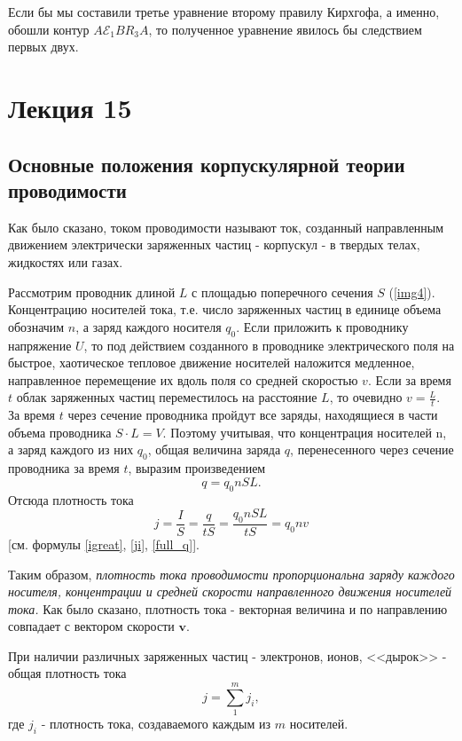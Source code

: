 \documentclass[a4paper,10pt]{book}
\begin{document}
Если бы мы составили третье уравнение  второму правилу Кирхгофа, а именно, обошли контур $A\mathcal{E}_1BR_3A$, то полученное уравнение
явилось бы следствием первых двух.
\chapter{Лекция 15}
\section*{Основные положения корпускулярной теории проводимости}
Как было сказано, током проводимости называют ток, созданный направленным движением электрически заряженных частиц - корпускул - в твердых телах,
 жидкостях или газах.
 
Рассмотрим проводник длиной $L$ с площадью поперечного сечения $S$ (\ref{img4}). Концентрацию носителей тока, т.е. число заряженных частиц 
в единице объема обозначим $n$, а заряд каждого носителя $q_0$. Если приложить к проводнику напряжение $U$, то под действием созданного в 
проводнике электрического поля на быстрое, хаотическое тепловое движение носителей наложится медленное, направленное перемещение их вдоль
поля со средней скоростью $v$. Если за время $t$ облак заряженных частиц переместилось на расстояние $L$, то очевидно $v = \frac{L}{t}$. 
За время $t$ через сечение проводника пройдут все заряды, находящиеся в части объема проводника $S\cdot L = V$. Поэтому учитывая, что концентрация
носителей n, а заряд каждого из них $q_0$, общая величина заряда $q$, перенесенного через сечение проводника за время $t$, выразим произведением
\begin{equation}\label{full_q}
 q = q_0nSL.
\end{equation}
Отсюда плотность тока
\begin{equation}\label{density}
 j = \frac{I}{S} = \frac{q}{tS} = \frac{q_0nSL}{tS} = q_0nv
\end{equation}
[см. формулы \ref{igreat}, \ref{ji}, \ref{full_q}].

Таким образом, \emph{плотность тока проводимости пропорциональна заряду каждого носителя, концентрации и средней скорости направленного движения 
носителей тока.} Как было сказано, плотность тока - векторная величина и по направлению совпадает с вектором скорости $\mathbf{v}$.

При наличии различных заряженных частиц - электронов, ионов, <<дырок>> - общая плотность тока
\begin{equation}\label{job}
 j = \sum_1^mj_i,
\end{equation}
где $j_i$ - плотность тока, создаваемого каждым из $m$ носителей.
\end{document}
